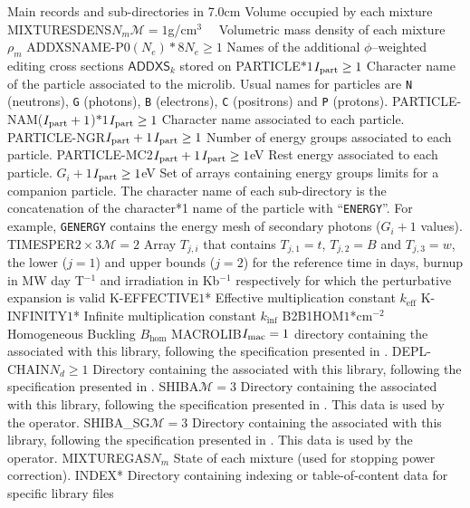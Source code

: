\begin{DescriptionEnregistrement}{Main records and sub-directories in }{7.0cm}
  {Volume occupied by each mixture}
\OptRealEnr
  {MIXTURESDENS}{$N_{m}$}{$\mathcal{M}=1$}{g/cm$^{3}$~~}
  {Volumetric mass density of each mixture $\rho_{m}$}
\OptCharEnr
  {ADDXSNAME-P0}{$(N_{e})*8$}{$N_{e}\ge 1$}
  {Names of the additional $\phi$--weighted editing cross sections $\mathsf{ADDXS}_{k}$ stored on }
\OptCharEnr
  {PARTICLE}{$*1$}{$I_{\rm part}\ge 1$} 
  {Character name of the particle associated to the microlib. Usual names for
  particles are {\tt N} (neutrons), {\tt G} (photons), {\tt B} (electrons),
  {\tt C} (positrons) and {\tt P} (protons).}
\OptCharEnr
  {PARTICLE-NAM}{($I_{\rm part}+1$)$*1$}{$I_{\rm part}\ge 1$} 
  {Character name associated to each particle.}
\OptIntEnr
  {PARTICLE-NGR}{$I_{\rm part}+1$}{$I_{\rm part}\ge 1$}
  {Number of energy groups associated to each particle.}
\OptRealEnr
  {PARTICLE-MC2}{$I_{\rm part}+1$}{$I_{\rm part}\ge 1$}{eV}
  {Rest energy associated to each particle.}
\OptRealVar
  {}{$G_i+1$}{$I_{\rm part}\ge 1$}{eV}
  {Set of arrays containing energy groups limits for a companion particle. The character name
  of each sub-directory is the concatenation of the character*1 name of the particle with ``{\tt ENERGY}''.
  For example, {\tt GENERGY} contains the energy mesh of secondary photons ($G_i+1$ values).}
\OptRealEnr
  {TIMESPER}{$2\times 3$}{$\mathcal{M}=2$}{}
  {Array $T_{j,i}$ that contains $T_{j,1}=t$, $T_{j,2}=B$ and $T_{j,3}=w$, the
   lower ($j=1$) and upper bounds ($j=2$) for the reference time in days, burnup
   in MW day T$^{-1}$ and irradiation in Kb$^{-1}$ respectively for which the
   perturbative expansion is valid}
\OptRealEnr
  {K-EFFECTIVE}{$1$}{*}{}
  {Effective multiplication constant $k_{\mathrm{eff}}$}
\OptRealEnr
  {K-INFINITY}{$1$}{*}{}
  {Infinite multiplication constant $k_{\mathrm{inf}}$}
\OptRealEnr
  {B2B1HOM}{$1$}{*}{cm$^{-2}$~~}
  {Homogeneous Buckling $B_{\mathrm{hom}}$}
\OptDirEnr
  {MACROLIB}{$I_{\rm mac} = 1$}
  {directory containing the  associated with this
  library, following the specification presented in .}
\OptDirEnr
  {DEPL-CHAIN}{$N_{d} \ge 1$}
  {Directory containing the  associated with this library, following
  the specification presented in .}
\OptDirEnr
  {SHIBA}{$\mathcal{M}=3$}
  {Directory containing the  associated with this
  library, following the specification presented in .
  This data is used by the  operator.}
\OptDirEnr
  {SHIBA\_SG}{$\mathcal{M}=3$}
  {Directory containing the  associated with this
  library, following the specification presented in .
  This data is used by the  operator.}
\IntEnr
  {MIXTUREGAS}{$N_{m}$}
  {State of each mixture (used for stopping power correction).}
\OptDirEnr
  {INDEX}{*}
  {Directory containing indexing or table-of-content data for specific library
  files}
\end{DescriptionEnregistrement}

